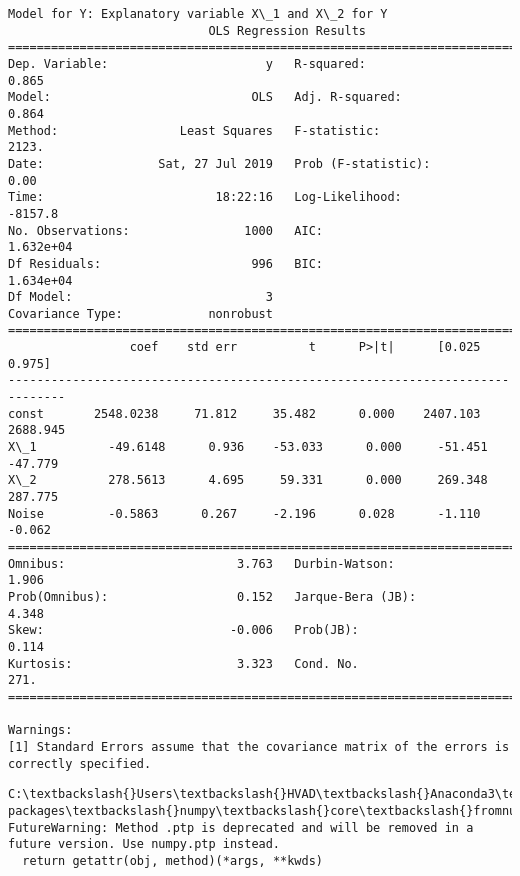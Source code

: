 \documentclass[11pt]{article}
\begin{document}
    \begin{Verbatim}[commandchars=\\\{\}]
Model for Y: Explanatory variable X\_1 and X\_2 for Y
                            OLS Regression Results                            
==============================================================================
Dep. Variable:                      y   R-squared:                       0.865
Model:                            OLS   Adj. R-squared:                  0.864
Method:                 Least Squares   F-statistic:                     2123.
Date:                Sat, 27 Jul 2019   Prob (F-statistic):               0.00
Time:                        18:22:16   Log-Likelihood:                -8157.8
No. Observations:                1000   AIC:                         1.632e+04
Df Residuals:                     996   BIC:                         1.634e+04
Df Model:                           3                                         
Covariance Type:            nonrobust                                         
==============================================================================
                 coef    std err          t      P>|t|      [0.025      0.975]
------------------------------------------------------------------------------
const       2548.0238     71.812     35.482      0.000    2407.103    2688.945
X\_1          -49.6148      0.936    -53.033      0.000     -51.451     -47.779
X\_2          278.5613      4.695     59.331      0.000     269.348     287.775
Noise         -0.5863      0.267     -2.196      0.028      -1.110      -0.062
==============================================================================
Omnibus:                        3.763   Durbin-Watson:                   1.906
Prob(Omnibus):                  0.152   Jarque-Bera (JB):                4.348
Skew:                          -0.006   Prob(JB):                        0.114
Kurtosis:                       3.323   Cond. No.                         271.
==============================================================================

Warnings:
[1] Standard Errors assume that the covariance matrix of the errors is correctly specified.

    \end{Verbatim}

    \begin{Verbatim}[commandchars=\\\{\}]
C:\textbackslash{}Users\textbackslash{}HVAD\textbackslash{}Anaconda3\textbackslash{}lib\textbackslash{}site-packages\textbackslash{}numpy\textbackslash{}core\textbackslash{}fromnumeric.py:52: FutureWarning: Method .ptp is deprecated and will be removed in a future version. Use numpy.ptp instead.
  return getattr(obj, method)(*args, **kwds)

    \end{Verbatim}
\end{document}
